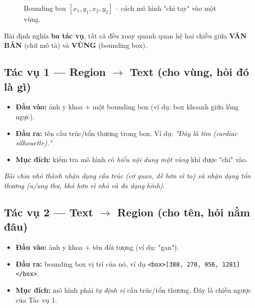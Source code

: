 \documentclass[12pt,a4paper,oneside]{extarticle}
\newcommand{\fact}[1]{#1}
\newcommand{\remark}[1]{\textit{#1}}
\newcommand{\important}[1]{\textbf{#1}}
\newcommand{\boxtok}[1]{\texttt{<box>#1</box>}}
\begin{document}
\begin{figure}[H]
\centering
{}
\caption{Bounding box $[x_1,y_1,x_2,y_2]$ -- cách mô hình "chỉ tay" vào một vùng.}
\label{fig:bbox}
\end{figure}

\fact{Bài định nghĩa \important{ba tác vụ}, tất cả đều xoay quanh quan hệ hai chiều giữa
\important{VĂN BẢN} (chữ mô tả) và \important{VÙNG} (bounding box).}

\subsection{Tác vụ 1 — Region $\to$ Text (cho vùng, hỏi đó là gì)}
\begin{itemize}
  \item \textbf{Đầu vào:} ảnh y khoa $+$ một bounding box (ví dụ: box khoanh giữa lồng ngực).
  \item \textbf{Đầu ra:} tên cấu trúc/tổn thương trong box. Ví dụ: \emph{"Đây là tim (cardiac
  silhouette)."}
  \item \textbf{Mục đích:} kiểm tra mô hình có \emph{hiểu nội dung một vùng} khi được "chỉ" vào.
\end{itemize}
\remark{Bài chia nhỏ thành nhận dạng \emph{cấu trúc} (cơ quan, dễ hơn vì to) và nhận dạng
\emph{tổn thương} (u/ung thư, khó hơn vì nhỏ và đa dạng hình).}

\subsection{Tác vụ 2 — Text $\to$ Region (cho tên, hỏi nằm đâu)}
\begin{itemize}
  \item \textbf{Đầu vào:} ảnh y khoa $+$ tên đối tượng (ví dụ: "gan").
  \item \textbf{Đầu ra:} bounding box vị trí của nó, ví dụ \boxtok{[388, 270, 956, 1281]}.
  \item \textbf{Mục đích:} mô hình phải \emph{tự định vị} cấu trúc/tổn thương. Đây là chiều
  ngược của Tác vụ 1.
\end{itemize}
\end{document}
